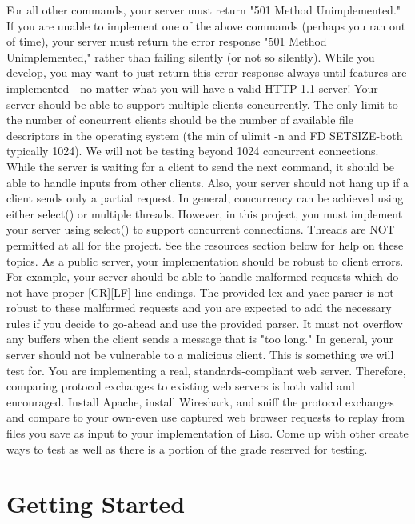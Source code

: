 \documentclass[12pt]{article}
\begin{document}
For all other commands, your server must return "501 Method Unimplemented." If you are unable to implement one of the above commands (perhaps you ran out of time), your server must return the error response "501 Method Unimplemented," rather than failing silently (or not so silently). While you develop, you may want to just return this error response always until features are implemented - no matter what you will have a valid HTTP 1.1 server!
Your server should be able to support multiple clients concurrently. The only limit to the number of concurrent clients should be the number of available file descriptors in the operating system (the min of ulimit -n and FD SETSIZE-both typically 1024). We will not be testing beyond 1024 concurrent connections. While the server is waiting for a client to send the next command, it should be able to handle inputs from other clients. Also, your server should not hang up if a client sends only a partial request. In general, concurrency can be achieved using either select() or multiple threads. However, in this project, you must implement your server using select() to support concurrent connections. Threads are NOT permitted at all for the project. See the resources section below for help on these topics. As a public server, your implementation should be robust to client errors. For example, your server should be able to handle malformed requests which do not have proper [CR][LF] line endings. The provided lex and yacc parser is not robust to these malformed requests and you are expected to add the necessary rules if you decide to go-ahead and use the provided parser. It must not overflow any buffers when the client sends a message that is "too long." In general, your server should not be vulnerable to a malicious client. This is something we will test for.
You are implementing a real, standards-compliant web server. Therefore, comparing protocol exchanges to existing web servers is both valid and encouraged. Install Apache, install Wireshark, and sniff the protocol exchanges and compare to your own-even use captured web browser requests to replay from files you save as input to your implementation of Liso. Come up with other create ways to test as well as there is a portion of the grade reserved for testing.

\section{Getting Started}
\end{document}
